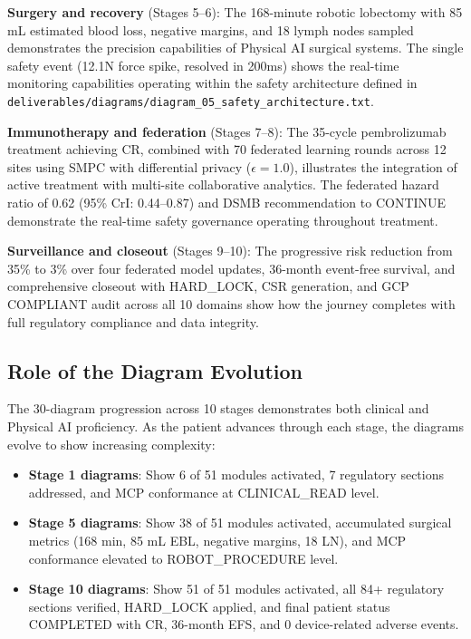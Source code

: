 \documentclass{article}
\begin{document}
\textbf{Surgery and recovery} (Stages 5--6): The 168-minute robotic lobectomy with 85 mL estimated blood loss, negative margins, and 18 lymph nodes sampled demonstrates the precision capabilities of Physical AI surgical systems. The single safety event (12.1N force spike, resolved in 200ms) shows the real-time monitoring capabilities operating within the safety architecture defined in \texttt{deliverables/diagrams/diagram\_05\_safety\_architecture.txt}.

\textbf{Immunotherapy and federation} (Stages 7--8): The 35-cycle pembrolizumab treatment achieving CR, combined with 70 federated learning rounds across 12 sites using SMPC with differential privacy ($\epsilon = 1.0$), illustrates the integration of active treatment with multi-site collaborative analytics. The federated hazard ratio of 0.62 (95\% CrI: 0.44--0.87) and DSMB recommendation to CONTINUE demonstrate the real-time safety governance operating throughout treatment.

\textbf{Surveillance and closeout} (Stages 9--10): The progressive risk reduction from 35\% to 3\% over four federated model updates, 36-month event-free survival, and comprehensive closeout with HARD\_LOCK, CSR generation, and GCP COMPLIANT audit across all 10 domains show how the journey completes with full regulatory compliance and data integrity.

\subsection{Role of the Diagram Evolution}

The 30-diagram progression across 10 stages demonstrates both clinical and Physical AI proficiency. As the patient advances through each stage, the diagrams evolve to show increasing complexity:

\begin{itemize}[leftmargin=*]
\item \textbf{Stage 1 diagrams}: Show 6 of 51 modules activated, 7 regulatory sections addressed, and MCP conformance at CLINICAL\_READ level.
\item \textbf{Stage 5 diagrams}: Show 38 of 51 modules activated, accumulated surgical metrics (168 min, 85 mL EBL, negative margins, 18 LN), and MCP conformance elevated to ROBOT\_PROCEDURE level.
\item \textbf{Stage 10 diagrams}: Show 51 of 51 modules activated, all 84+ regulatory sections verified, HARD\_LOCK applied, and final patient status COMPLETED with CR, 36-month EFS, and 0 device-related adverse events.
\end{itemize}
\end{document}
